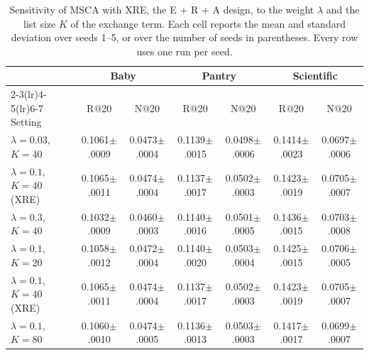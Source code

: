 \begin{table}[!t]
\caption{Sensitivity of MSCA with XRE, the E + R + A design, to the weight $\lambda$ and the list size $K$ of the exchange term. Each cell reports the mean and standard deviation over seeds 1--5, or over the number of seeds in parentheses. Every row uses one run per seed. \sensMesBabyNote{}}
\label{tab:sensitivity}
\centering
\scriptsize
\setlength{\tabcolsep}{2pt}
\begin{tabular}{lcccccc}
\toprule
 & \multicolumn{2}{c}{Baby} & \multicolumn{2}{c}{Pantry} & \multicolumn{2}{c}{Scientific} \\
\cmidrule(lr){2-3}\cmidrule(lr){4-5}\cmidrule(lr){6-7}
Setting & R@20 & N@20 & R@20 & N@20 & R@20 & N@20 \\
\midrule
$\lambda=0.03$, $K=40$ & 0.1061{\tiny$\pm$.0009} & 0.0473{\tiny$\pm$.0004} & 0.1139{\tiny$\pm$.0015} & 0.0498{\tiny$\pm$.0006} & 0.1414{\tiny$\pm$.0023} & 0.0697{\tiny$\pm$.0006} \\
$\lambda=0.1$, $K=40$ (XRE) & 0.1065{\tiny$\pm$.0011} & 0.0474{\tiny$\pm$.0004} & 0.1137{\tiny$\pm$.0017} & 0.0502{\tiny$\pm$.0003} & 0.1423{\tiny$\pm$.0019} & 0.0705{\tiny$\pm$.0007} \\
$\lambda=0.3$, $K=40$ & 0.1032{\tiny$\pm$.0009} & 0.0460{\tiny$\pm$.0003} & 0.1140{\tiny$\pm$.0016} & 0.0501{\tiny$\pm$.0005} & 0.1436{\tiny$\pm$.0015} & 0.0703{\tiny$\pm$.0008} \\
\midrule
$\lambda=0.1$, $K=20$ & 0.1058{\tiny$\pm$.0012} & 0.0472{\tiny$\pm$.0004} & 0.1140{\tiny$\pm$.0020} & 0.0503{\tiny$\pm$.0004} & 0.1425{\tiny$\pm$.0015} & 0.0706{\tiny$\pm$.0005} \\
$\lambda=0.1$, $K=40$ (XRE) & 0.1065{\tiny$\pm$.0011} & 0.0474{\tiny$\pm$.0004} & 0.1137{\tiny$\pm$.0017} & 0.0502{\tiny$\pm$.0003} & 0.1423{\tiny$\pm$.0019} & 0.0705{\tiny$\pm$.0007} \\
$\lambda=0.1$, $K=80$ & 0.1060{\tiny$\pm$.0010} & 0.0474{\tiny$\pm$.0005} & 0.1136{\tiny$\pm$.0013} & 0.0503{\tiny$\pm$.0003} & 0.1417{\tiny$\pm$.0017} & 0.0699{\tiny$\pm$.0007} \\
\bottomrule
\end{tabular}
\end{table}
